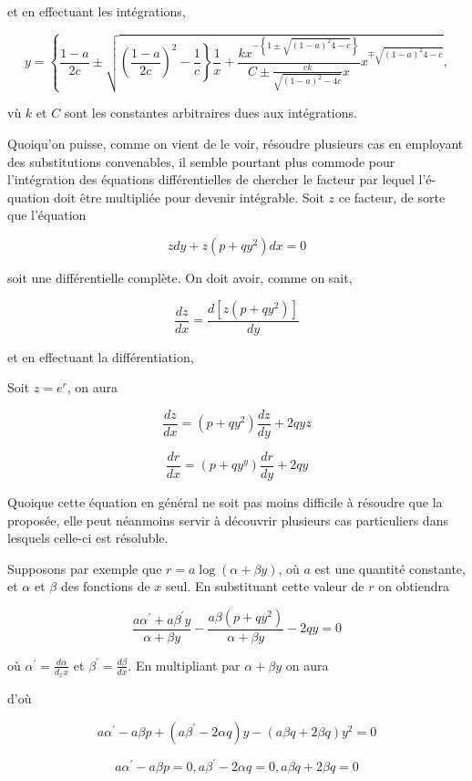 \documentclass{article}
\begin{document}
et en effectuant les intégrations,

\[
y=\left\{\frac{1-a}{2 c} \pm \sqrt{\left.\left(\frac{1-a}{2 c}\right)^{2}-\frac{1}{c}\right\} \frac{1}{x}+\frac{k x^{-\left\{1 \pm \sqrt{(1-a)^{2} 4-c}\right\}}}{C \pm \frac{c k}{\sqrt{(1-a)^{2}-4 c}} x} x^{\mp \sqrt{(1-a)^{2} 4-c}}},\right.
\]

vù \(k\) et \(C\) sont les constantes arbitraires dues aux intégrations.

Quoiqu'on puisse, comme on vient de le voir, résoudre plusieurs cas en employant des substitutions convenables, il semble pourtant plus commode pour l'intégration des équations différentielles de chercher le facteur par lequel l'é-
quation doit être multipliée pour devenir intégrable. Soit \(z\) ce facteur, de sorte que l'équation

\[
z d y+z\left(p+q y^{2}\right) d x=0
\]

soit une différentielle complète. On doit avoir, comme on sait,

\[
\frac{d z}{d x}=\frac{d\left[z\left(p+q y^{2}\right)\right]}{d y}
\]

et en effectuant la différentiation,

Soit \(z=e^{r}\), on aura

\[
\frac{d z}{d x}=\left(p+q y^{2}\right) \frac{d z}{d y}+2 q y z
\]

\[
\frac{d r}{d x}=\left(p+q y^{y}\right) \frac{d r}{d y}+2 q y
\]

Quoique cette équation en général ne soit pas moins difficile à résoudre que la proposée, elle peut néanmoins servir à découvrir plusieurs cas particuliers dans lesquels celle-ci est résoluble.

Supposons par exemple que \(r=a \log (\alpha+\beta y)\), où \(a\) est une quantité constante, et \(\alpha\) et \(\beta\) des fonctions de \(x\) seul. En substituant cette valeur de \(r\) on obtiendra

\[
\frac{a \alpha^{\prime}+a \beta^{\prime} y}{\alpha+\beta y}-\frac{a \beta\left(p+q y^{2}\right)}{\alpha+\beta y}-2 q y=0
\]

où \(\alpha^{\prime}=\frac{d \alpha}{d_{x} x}\) et \(\beta^{\prime}=\frac{d \beta}{d x}\). En multipliant par \(\alpha+\beta y\) on aura

d'où

\[
a \alpha^{\prime}-a \beta p+\left(a \beta^{\prime}-2 \alpha q\right) y-(a \beta q+2 \beta q) y^{2}=0
\]

\[
a \alpha^{\prime}-a \beta p=0, a \beta^{\prime}-2 \alpha q=0, a \beta q+2 \beta q=0
\]
\end{document}
